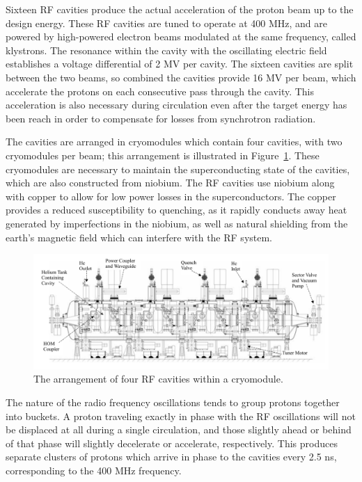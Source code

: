 Sixteen \ac{RF} cavities produce the  actual acceleration of the proton beam up to the design energy.
These \ac{RF} cavities are tuned to operate at 400 MHz, and are powered by high-powered electron beams modulated at the same frequency, called klystrons.
The resonance within the cavity with the oscillating electric field establishes a voltage differential of 2 MV per cavity.
The sixteen cavities are split between the two beams, so combined the cavities provide 16 MV per beam, which accelerate the protons on each consecutive pass through the cavity.
This acceleration is also necessary during circulation even after the target energy has been reach in order to compensate for losses from synchrotron radiation.

The cavities are arranged in cryomodules which contain four cavities, with two cryomodules per beam; this arrangement is illustrated in Figure~\ref{fig:rfcavity}.
These cryomodules are necessary to maintain the superconducting state of the cavities, which are also constructed from niobium.
The \ac{RF} cavities use niobium along with copper to allow for low power losses in the superconductors.
The copper provides a reduced susceptibility to quenching, as it rapidly conducts away heat generated by imperfections in the niobium, as well as natural shielding from the earth's magnetic field which can interfere with the \ac{RF} system.

\begin{figure}
\centering
\includegraphics[width=\fullfig]{figures/rfcavity.png}
\caption{The arrangement of four \ac{RF} cavities within a cryomodule.}
\label{fig:rfcavity}
\end{figure}

The nature of the radio frequency oscillations tends to group protons together into buckets.
A proton traveling exactly in phase with the \ac{RF} oscillations will not be displaced at all during a single circulation, and those slightly ahead or behind of that phase will slightly decelerate or accelerate, respectively.
This produces separate clusters of protons which arrive in phase to the cavities every 2.5 ns, corresponding to the 400 MHz frequency.

